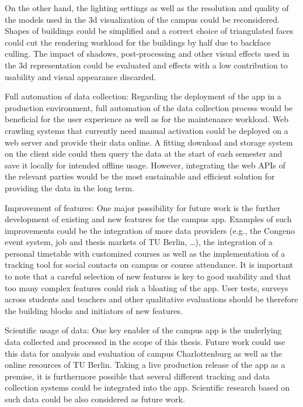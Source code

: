 On the other hand, the lighting settings as well as the resolution and quality of the models used in the 3d visualization of the campus could be reconsidered. Shapes of buildings could be simplified and a correct choice of triangulated faces could cut the rendering workload for the buildings by half due to backface culling. The impact of shadows, post-processing and other visual effects used in the 3d representation could be evaluated and effects with a low contribution to usability and visual appearance discarded.

Full automation of data collection: Regarding the deployment of the app in a production environment, full automation of the data collection process would be beneficial for the user experience as well as for the maintenance workload. Web crawling systems that currently need manual activation could be deployed on a web server and provide their data online. A fitting download and storage system on the client side could then query the data at the start of each semester and save it locally for intended offline usage. However, integrating the web APIs of the relevant parties would be the most sustainable and efficient solution for providing the data in the long term.

Improvement of features: One major possibility for future work is the further development of existing and new features for the campus app. Examples of such improvements could be the integration of more data providers (e.g., the Congeno event system, job and thesis markets of TU Berlin, \ldots), the integration of a personal timetable with customized courses as well as the implementation of a tracking tool for social contacts on campus or course attendance. It is important to note that a careful selection of new features is key to good usability and that too many complex features could risk a bloating of the app. User tests, surveys across students and teachers and other qualitative evaluations should be therefore the building blocks and initiators of new features. 

Scientific usage of data: One key enabler of the campus app is the underlying data collected and processed in the scope of this thesis. Future work could use this data for analysis and evaluation of campus Charlottenburg as well as the online resources of TU Berlin. Taking a live production release of the app as a premise, it is furthermore possible that several different tracking and data collection systems could be integrated into the app. Scientific research based on such data could be also considered as future work.

